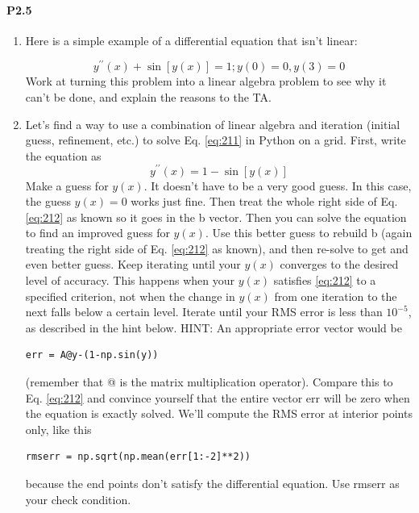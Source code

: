 \documentclass{book}
\theoremstyle{plain}
\theoremstyle{definition}
\numberwithin{exm}{chapter}
\theoremstyle{remark}
\theoremstyle{summary}
\theoremstyle{overview}
\begin{document}
\paragraph*{P2.5}
\begin{enumerate}[label=(\alph*)]
\item Here is a simple example of a differential equation that isn\rq t linear:

	\begin{equation}\label{eq:211}
		y^{\prime\prime}(x) + \sin[y(x)] = 1 ; y(0) = 0, y(3) = 0
	\end{equation}
		Work at turning this problem into a linear algebra problem to see why
it can\rq t be done, and explain the reasons to the TA.
\item Let\rq s find a way to use a combination of linear algebra and iteration
(initial guess, refinement, etc.) to solve Eq. \eqref{eq:211} in Python on a grid.
First, write the equation as
\begin{equation}\label{eq:212}
		y^{\prime\prime}(x)= 1 - \sin[y(x)]
	\end{equation}
	Make a guess for $y(x)$. It doesn\rq t have to be a very good guess. In this
case, the guess $y(x) = 0$ works just fine. Then treat the whole right side
of Eq.\eqref{eq:212} as known so it goes in the b vector. Then you can solve the equation to find an improved guess for
$y(x)$. Use this better guess to rebuild b (again treating the right side of Eq. \eqref{eq:212} as known), and
then re-solve to get and even better guess. Keep iterating until your $y(x)$ converges to the desired level of accuracy. This happens when your $y(x)$  satisfies \eqref{eq:212}  to a specified criterion, not when the change
in $y(x)$ from one iteration to the next falls below a certain level. Iterate until your RMS error is less than $10^{-5}$, as described in the hint below.
HINT: An appropriate error vector would be
\begin{lstlisting}
err = A@y-(1-np.sin(y))
\end{lstlisting}
(remember that @ is the matrix multiplication operator). Compare
this to Eq. \eqref{eq:212}
 and convince yourself that the entire vector err will
be zero when the equation is exactly solved. We\rq ll compute the RMS
error at interior points only, like this
\begin{lstlisting}
rmserr = np.sqrt(np.mean(err[1:-2]**2))
\end{lstlisting}
because the end points don\rq t satisfy the differential equation. Use rmserr as your check condition.
\end{enumerate}
\end{document}
